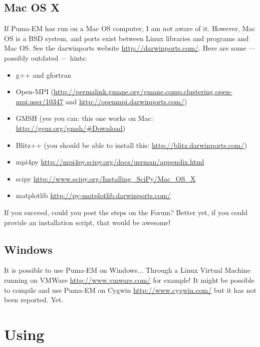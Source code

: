 \documentclass[a4paper,10pt]{book}
\begin{document}
\section{Mac OS X}
%
\par
If Puma-EM has run on a Mac OS computer, I am not aware of it. However, Mac OS is a BSD system, and ports exist between Linux libraries and programs and Mac OS. See the darwinports website \url{http://darwinports.com/}. Here are some --- possibly outdated --- hints:
\begin{itemize}
\item g++ and gfortran
\item Open-MPI (\url{http://permalink.gmane.org/gmane.comp.clustering.open-mpi.user/10347} and \url{http://openmpi.darwinports.com/})
\item GMSH (yes you can: this one works on Mac: \url{http://geuz.org/gmsh/#Download})
\item Blitz++ (you should be able to install this: \url{http://blitz.darwinports.com/})
\item mpi4py \url{http://mpi4py.scipy.org/docs/usrman/appendix.html}
\item scipy \url{http://www.scipy.org/Installing_SciPy/Mac_OS_X}
\item matplotlib \url{http://py-matplotlib.darwinports.com/}
\end{itemize}
If you succeed, could you post the steps on the Forum? Better yet, if you could provide an installation script, that would be awesome!


\section{Windows}
%
\par
It is possible to use Puma-EM on Windows... Through a Linux Virtual Machine running on VMWare \url{http://www.vmware.com/} for example! It might be possible to compile and use Puma-EM on Cygwin \url{http://www.cygwin.com/} but it has not been reported. Yet. 


\chapter{Using}
\end{document}
